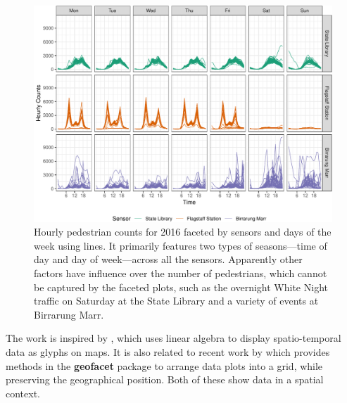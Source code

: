 \documentclass[12pt]{article}
\begin{document}
\begin{figure}

{\centering \includegraphics[width=\textwidth]{figure/facet-time-1} 

}

\caption{Hourly pedestrian counts for 2016 faceted by sensors and days of the week using lines. It primarily features two types of seasons---time of day and day of week---across all the sensors. Apparently other factors have influence over the number of pedestrians, which cannot be captured by the faceted plots, such as the overnight White Night traffic on Saturday at the State Library and a variety of events at Birrarung Marr.}\label{fig:facet-time}
\end{figure}

The work is inspired by \citet{Wickham2012glyph}, which uses linear
algebra to display spatio-temporal data as glyphs on maps. It is also
related to recent work by \citet{R-geofacet} which provides methods in
the \textbf{geofacet} package to arrange data plots into a grid, while
preserving the geographical position. Both of these show data in a
spatial context.
\end{document}
